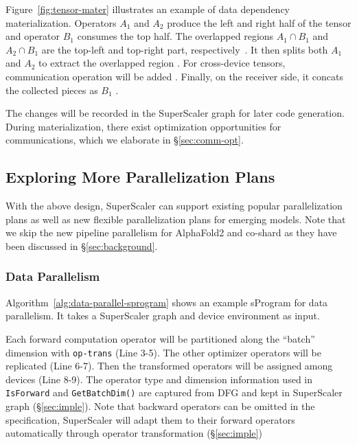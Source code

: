 Figure~\ref{fig:tensor-mater} illustrates an example of data dependency materialization. Operators $A_{1}$ and $A_{2}$ produce the left and right half of the tensor and operator $B_{1}$ consumes the top half. The overlapped regions $A_{1} \cap B_{1}$ and $A_{2} \cap B_{1}$ are the top-left and top-right part, respectively~.
It then splits both $A_{1}$ and $A_{2}$ to extract the overlapped region .
For cross-device tensors, communication operation will be added .
Finally, on the receiver side, it concats the collected pieces as $B_{1}$ .

The changes will be recorded in the {SuperScaler} graph for later code generation. During materialization, there exist optimization opportunities for communications, which we elaborate in \S\ref{sec:comm-opt}.

\subsection{Exploring More Parallelization Plans}
\label{subsec:example-para}

With the above design, {SuperScaler} can support existing popular parallelization plans as well as new flexible parallelization plans for emerging models. Note that we skip the new pipeline parallelism for AlphaFold2 and {co-shard} as they have been discussed in \S\ref{sec:background}. 

\subsubsection{Data Parallelism}

Algorithm~\ref{alg:data-parallel-sprogram} shows an example {sProgram} for data parallelism. It takes a {SuperScaler} graph and device environment as input.

Each forward computation operator will be partitioned along the ``batch'' dimension with \texttt{op-trans} (Line 3-5). The other optimizer operators will be replicated (Line 6-7). Then the transformed operators will be assigned among devices (Line 8-9). The operator type and dimension information used in \texttt{IsForward} and \texttt{GetBatchDim()} are captured from DFG and kept in {SuperScaler} graph (\S\ref{sec:imple}).
Note that backward operators can be omitted in the specification, {SuperScaler} will adapt them to their forward operators automatically through operator transformation (\S\ref{sec:imple})

\begin{algorithm}[t]
\DontPrintSemicolon \small

   ndevs $\gets$ $\lvert$env.devices$\rvert$ 


     \Else()


   }
\caption{Data Parallelism {sProgram}.}
\label{alg:data-parallel-sprogram}
\end{algorithm}

